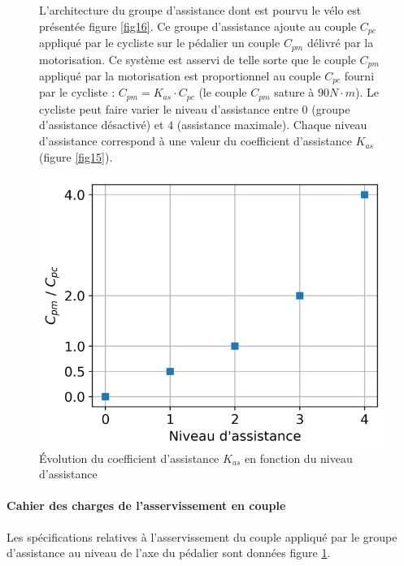 \begin{figure}[ht!]
\begin{minipage}{0.6\linewidth}
L’architecture du groupe d’assistance dont est pourvu le vélo est présentée figure \ref{fig16}. Ce groupe d’assistance ajoute au couple $C_{pc}$ appliqué par le cycliste sur le pédalier un couple $C_{pm}$ délivré par la motorisation. Ce système est asservi de telle sorte que le couple $C_{pm}$ appliqué par la motorisation est proportionnel au couple $C_{pc}$ fourni par le cycliste : $C_{pm}=K_{as}\cdot C_{pc}$ (le couple $C_{pm}$ sature à $90 N\cdot m$). Le cycliste peut faire varier le niveau d’assistance entre $0$ (groupe d’assistance désactivé) et $4$ (assistance maximale). Chaque niveau d’assistance correspond à une valeur du coefficient d’assistance $K_{as}$ (figure \ref{fig15}).
\end{minipage}\hfill
\begin{minipage}{0.35\linewidth}
\begin{center}
\includegraphics[width=.95\linewidth]{img/fig14}
\caption{\label{fig14}Évolution du coefficient d’assistance $K_{as}$ en fonction du niveau d’assistance}
\end{center}
\end{minipage}
\end{figure}

\paragraph{Cahier des charges de l’asservissement en couple} Les spécifications relatives à l’asservissement du couple appliqué par le groupe d’assistance au niveau de l’axe du pédalier sont données figure \ref{fig14}.

